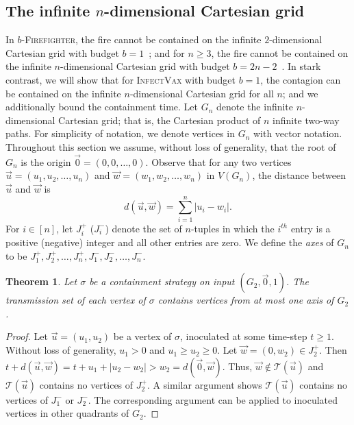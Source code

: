 \documentclass[unknownkeysallowed]{article}
\newtheorem{theorem}{Theorem}[section]
\theoremstyle{definition}\newtheorem{strategy}{Strategy}
\theoremstyle{definition}\newtheorem{notation}{Notation}[theorem]
\newcommand*{\Fire}{\textup{\textsc{Firefighter}}\xspace} %
\newcommand*{\bFire}{$b$-\Fire} %
\newcommand*{\IV}{\textup{\textsc{InfectVax}}\xspace}
\begin{document}
\subsection{The infinite $n$-dimensional Cartesian grid}\label{sec:Cart}

In \bFire, the fire cannot be contained on the infinite $2$-dimensional Cartesian grid with budget $b=1$~\cite{moeller_2002}; and for $n \geq 3$, the fire cannot be contained on the infinite $n$-dimensional Cartesian grid with budget $b=2n-2$~\cite{develin_2004}.  In stark contrast, we will show that for \IV with budget $b=1$, the contagion can be contained on the infinite $n$-dimensional Cartesian grid for all $n$; and we additionally bound the containment time.  Let $G_n$ denote the infinite $n$-dimensional Cartesian grid; that is, the Cartesian product of $n$ infinite two-way paths. For simplicity of notation, we denote vertices in $G_n$ with vector notation.  Throughout this section we assume, without loss of generality, that the root of $G_n$ is the origin $\vec{0} = (0,0,\dots,0)$. 
Observe that for any two vertices $\vec{u} = (u_1,u_2,\dots,u_n)$ and $\vec{w} = (w_1,w_2,\dots,w_n)$ in $V(G_n)$, the distance between $\vec{u}$ and $\vec{w}$ is $$d(\vec{u},\vec{w}) = \sum_{i=1}^n |u_i-w_i|.$$ For $i \in [n]$, let $J^+_i$ ($J^-_i$) denote the set of $n$-tuples in which the $i^{th}$ entry is a positive (negative) integer and all other entries are zero.  We define the {\it axes} of $G_n$ to be $J^+_1,J^+_2,\dots,J^+_n,J^-_1,J^-_2,\dots,J^-_n$.
  

\begin{theorem} \label{lem:T_i}
Let $\sigma$ be a containment strategy on input $(G_2,\vec{0},1)$.  The transmission set of each vertex of $\sigma$ contains  vertices from at most one axis of $G_2$.
\end{theorem}

\begin{proof} Let $\vec{u} = (u_1,u_2)$ be a vertex of $\sigma$, inoculated at some time-step $t \geq 1$. Without loss of generality, $u_1>0$ and $u_1 \geq u_2 \geq 0$.  Let $\vec{w} = (0,w_2) \in J_2^+$.  Then $t+d(\vec{u},\vec{w}) = t+u_1+|u_2-w_2| > w_2 = d(\vec{0},\vec{w})$.  Thus, $\vec{w} \not\in \mathcal{T}(\vec{u})$ and $\mathcal{T}(\vec{u})$ contains no vertices of $J^+_2$.  A similar argument shows $\mathcal{T}(\vec{u})$ contains no vertices of $J_1^-$ or $J_2^-$.  The corresponding argument can be applied to inoculated vertices in other quadrants of $G_2$.
\end{proof} 
\end{document}
